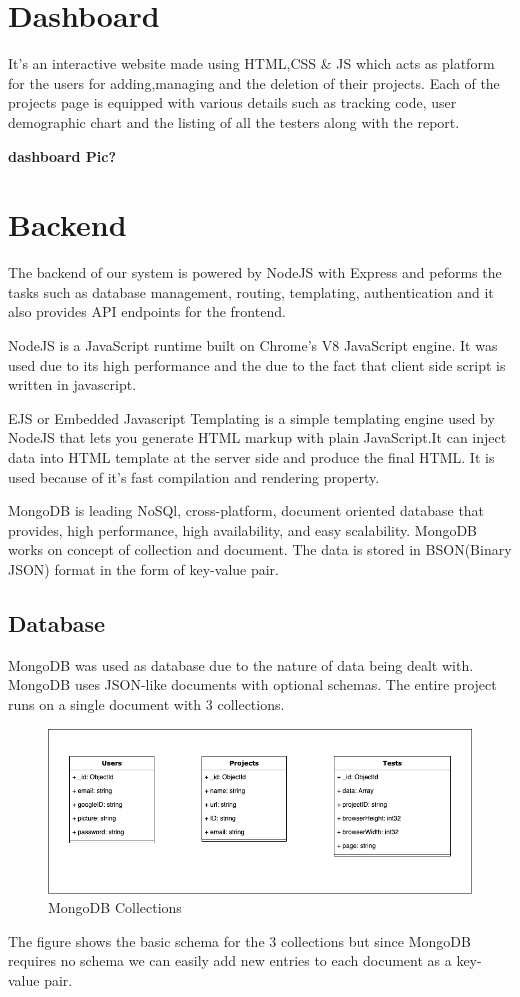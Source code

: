 \documentclass[12pt,a4paper,final]{extreport}
\begin{document}
\section{Dashboard}

It's an interactive website made using HTML,CSS \& JS which acts as platform for the users for adding,managing and the deletion of their projects.
Each of the projects page is equipped with various details such as tracking code, user demographic chart and the listing of all the testers along with the report.

\textbf{dashboard Pic?}
\newpage
\section{Backend}
The backend of our system is powered by NodeJS with Express and peforms the tasks such as database management, routing, templating, authentication and it also provides API endpoints for the frontend. 

NodeJS is a JavaScript runtime built on Chrome's V8 JavaScript engine. It was used due to its high performance and the due to the fact that client side script is written in javascript.

EJS or Embedded Javascript Templating is a simple templating engine used by NodeJS that lets you generate HTML markup with plain JavaScript.It can inject data into HTML template at the server side and produce the final HTML. It is used because of it's fast compilation and rendering property.

MongoDB is leading NoSQl, cross-platform, document oriented database that provides, high performance, high availability, and easy scalability. MongoDB works on concept of collection and document. The data is stored in BSON(Binary JSON) format in the form of key-value pair.

\subsection{Database}
MongoDB was used as database due to the nature of data being dealt with. MongoDB uses JSON-like documents with optional schemas. The entire project runs on a single document with 3 collections.

\begin{figure}[H]
    \centering
    \includegraphics[width=\linewidth]{db.png}
    \caption{MongoDB Collections}
\end{figure}
The figure shows the basic schema for the 3 collections but since MongoDB requires no schema we can easily add new entries to each document as a key-value pair.
\end{document}
